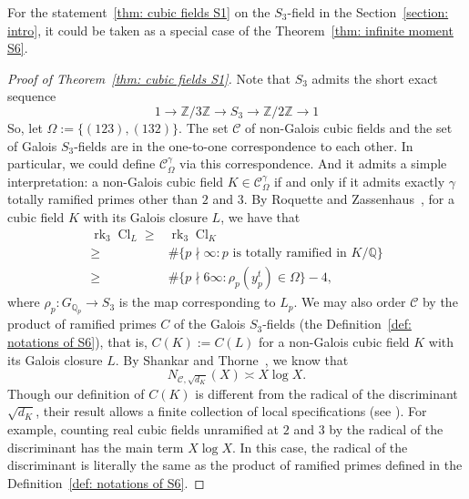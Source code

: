 \documentclass[12pt,a4paper]{amsart}
\numberwithin{equation}{section}%
\theoremstyle{plain}%
\theoremstyle{definition}%
\theoremstyle{remark}%
\begin{document}
    For the statement~\ref{thm: cubic fields S1} on the $S_{3}$-field in the Section~\ref{section: intro}, it could be taken as a special case of the Theorem~\ref{thm: infinite moment S6}.
    \begin{proof}[Proof of Theorem~\ref{thm: cubic fields S1}]
    	Note that $S_{3}$ admits the short exact sequence
    	\begin{equation*}
    		1\to\mathbb{Z}/3\mathbb{Z}\to S_{3}\to\mathbb{Z}/2\mathbb{Z}\to1
    	\end{equation*} 
    	So, let $\Omega:=\{(123),(132)\}$.
    	The set $\mathcal{C}$ of non-Galois cubic fields and the set of Galois $S_{3}$-fields are in the one-to-one correspondence  to each other.
    	In particular, we could define $\mathcal{C}_{\Omega}^{\gamma}$ via this correspondence.
    	And it admits a simple interpretation: a non-Galois cubic field $K\in\mathcal{C}_{\Omega}^{\gamma}$ if and only if it admits exactly $\gamma$ totally ramified primes other than $2$ and $3$.
    	By Roquette and Zassenhaus~\cite[Theorem 1]{RZ1969ClassRank}, for a cubic field $K$ with its Galois closure $L$, we have that
    	\begin{align*}
    		\operatorname{rk}_{3}\operatorname{Cl}_{L}\geq & \operatorname{rk}_{3}\operatorname{Cl}_{K} \\
    		\geq & \#\{p\nmid\infty:p\text{ is totally ramified in }K/\mathbb{Q}\} \\
    		\geq & \#\{p\nmid 6\infty:\rho_{p}(y_{p}^{t})\in\Omega\}-4,
    	\end{align*}
    	where $\rho_{p}:G_{\mathbb{Q}_{p}}\to S_{3}$ is the map corresponding to $L_{p}$.    	
    	We may also order $\mathcal{C}$ by the product of ramified primes $C$ of the Galois $S_{3}$-fields (the Definition~\ref{def: notations of S6}), that is, $C(K):=C(L)$ for a non-Galois cubic field $K$ with its Galois closure $L$.
    	By Shankar and Thorne~\cite{shankar2024asymptoticscubicfieldsordered}, we know that
    	\begin{equation*}
    		N_{\mathcal{C},\sqrt{d_{K}}}(X)\asymp X\log X.
    	\end{equation*}
    	Though our definition of $C(K)$ is different from the radical of the discriminant $\sqrt{d_{K}}$, their result allows a finite collection of local specifications (see \cite[Theorem 22]{shankar2024asymptoticscubicfieldsordered}).
    	For example, counting real cubic fields unramified at $2$ and $3$ by the radical of the discriminant has the main term $X\log X$.
    	In this case, the radical of the discriminant is literally the same as the product of ramified primes defined in the Definition~\ref{def: notations of S6}.

\end{proof}
\end{document}
